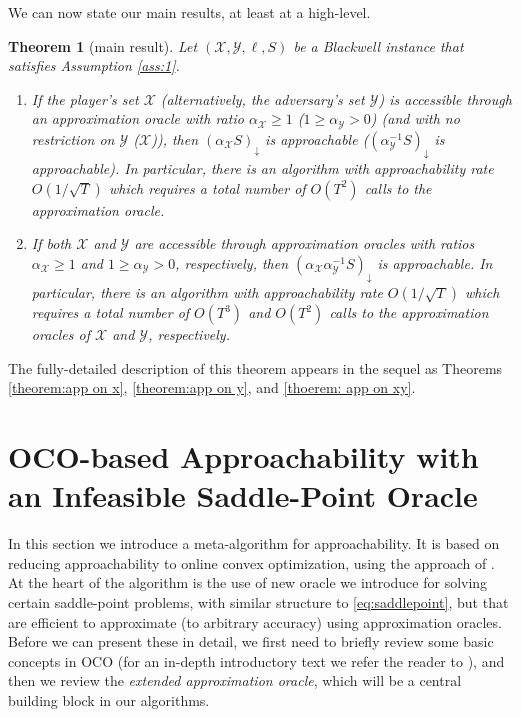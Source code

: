 \documentclass[a4paper,12pt]{article}
\newtheorem{theorem} {Theorem}
\newcommand{\mY}{\mathcal{Y}}
\newcommand{\mX}{\mathcal{X}}
\begin{document}
We can now state our main results, at least at a high-level.
\begin{theorem}[main result]\label{thm:main}
Let $(\mX,\mY,\ell,S)$ be a Blackwell instance that satisfies Assumption \ref{ass:1}. 
\begin{enumerate}
\item
If the player's set $\mX$ (alternatively, the adversary's set $\mY$) is accessible through an approximation oracle with ratio  $\alpha_{\mX} \geq 1$ ($1\geq \alpha_{\mY} > 0$)  (and with no restriction on $\mY$ ($\mX$)), then $(\alpha_{\mX}S)_{\downarrow}$ is approachable ($(\alpha_{\mY}^{-1}S)_{\downarrow}$ is approachable). In particular, there is an algorithm with approachability rate $O(1/\sqrt{T})$ which requires a  total number of $O(T^2)$ calls to the approximation oracle.
\item
If both $\mX$ and $\mY$ are accessible through  approximation oracles with ratios $\alpha_{\mX} \geq 1$ and  $1 \geq \alpha_{\mY} >0$, respectively, then $(\alpha_{\mX}\alpha_{\mY}^{-1}S)_{\downarrow}$ is approachable. In particular, there is an algorithm with approachability rate $O(1/\sqrt{T})$ which requires a  total number of $O(T^3)$ and $O(T^2)$ calls to the approximation oracles of $\mX$ and $\mY$, respectively.
\end{enumerate}
\end{theorem}

The fully-detailed description of this theorem appears in the sequel as Theorems \ref{theorem:app on x}, \ref{theorem:app on y}, and \ref{thoerem: app on xy}.


\section{OCO-based Approachability with an Infeasible Saddle-Point Oracle}
In this section we introduce a meta-algorithm for approachability. It is based on reducing approachability to online convex optimization, using the approach of \cite{shimkin2016online}. At the heart of the algorithm is the use of new oracle we introduce for solving certain saddle-point problems, with similar structure to \eqref{eq:saddlepoint}, but that are efficient to approximate (to arbitrary accuracy) using approximation oracles. Before we can present these in detail, we first need to briefly review some basic concepts in OCO (for an in-depth introductory text we refer the reader to \cite{DBLP:journals/corr/abs-1909-05207}), and then we review the \textit{extended approximation oracle}, which will be a central building block in our algorithms.
\end{document}
